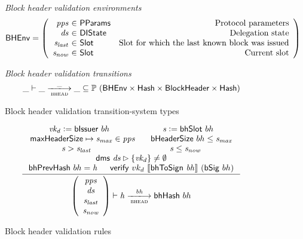 \documentclass[11pt,a4paper]{article}
\newcommand{\powerset}[1]{\mathbb{P}~#1}
\newcommand{\restrictrange}{\rhd}
\newcommand{\var}[1]{\mathit{#1}}
\newcommand{\fun}[1]{\mathsf{#1}}
\newcommand{\type}[1]{\mathsf{#1}}
\newcommand{\trans}[2]{\xlongrightarrow[\textsc{#1}]{#2}}
\newcommand{\serialised}[1]{\llbracket \var{#1} \rrbracket}
\newcommand{\leteq}{\ensuremath{\mathrel{\mathop:}=}}
\newcommand{\Hash}{\type{Hash}}  %
\newcommand{\Slot}{\type{Slot}}
\newcommand{\DelegState}{\type{DIState}}
\newcommand{\ProtParams}{\type{PParams}} %
\newcommand{\bhdrsizename}{bHeaderSize}
\newcommand{\verifyname}{verify}
\newcommand{\bsigname}{bSig}
\newcommand{\bissuername}{bIssuer}
\newcommand{\verify}[3]{\fun{\verifyname} ~ #1 ~ #2 ~ #3}
\newcommand{\bhdrsize}[1]{\fun{\bhdrsizename} ~ #1}
\newcommand{\bsig}[1]{\fun{\bsigname} ~ #1}
\newcommand{\bissuer}[1]{\fun{\bissuername} ~ #1}
\begin{document}
\begin{figure}[ht]
  \emph{Block header validation environments}
  \begin{equation*}
    \BHEnv =
    \left(
      \begin{array}{r@{~\in~}lr}
        \var{pps} & \ProtParams & \text{Protocol parameters} \\
        \var{ds} & \DelegState & \text{Delegation state} \\
        \var{s_{last}} & \Slot & \text{Slot for which the last known block was issued} \\
        \var{s_{now}} & \Slot & \text{Current slot} \\
      \end{array}
    \right)
  \end{equation*}

  \emph{Block header validation transitions}
  \begin{equation*}
    \_ \vdash \var{\_} \trans{bhead}{\_} \var{\_} \subseteq
    \powerset (\BHEnv \times \Hash \times \Bhead \times \Hash)
  \end{equation*}
  \caption{Block header validation transition-system types}
  \label{fig:ts-types:bhead}
\end{figure}

\begin{figure}[ht]
  \begin{equation*}
    \inference
    { \var{vk_d} \leteq \bissuer{bh} & \var{s} \leteq \bhslot{bh}
    \\ \maxheadersize \mapsto \var{s_{max}} \in \var{pps} & \bhdrsize{bh} \leq \var{s_{max}}
    \\ \var{s} > \var{s_{last}} & \var{s} \leq \var{s_{now}}
    \\ \fun{dms} ~  \var{ds} \restrictrange \{\var{vk_d}\} \neq \emptyset
    \\ \bhprevhash{bh} = \var{h} & \verify{vk_d}{\serialised{\bhtosign{bh}}}{(\bsig{bh})}
    }
    {
      \left(
        {\begin{array}{c}
           \var{pps} \\
           \var{ds} \\
           \var{s_{last}} \\
           \var{s_{now}} \\
        \end{array}}
      \right)
      \vdash
        {\var{h}}
      \trans{bhead}{\var{bh}}
        {\bhhash{bh}}
    }
  \end{equation*}
  \caption{Block header validation rules}
  \label{fig:rules:bhead}
\end{figure}
\end{document}

